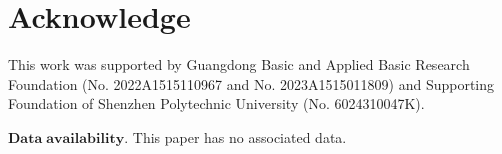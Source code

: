 \documentclass[11pt,twoside]{article}
\theoremstyle{definition}
\theoremstyle{remark}
\begin{document}






\section{Acknowledge}
This work was supported by Guangdong Basic and Applied Basic Research Foundation (No. 2022A1515110967 and No. 2023A1515011809) and Supporting Foundation of Shenzhen Polytechnic University (No. 6024310047K).


\begin{flushleft}
 $\mathbf{Data\;availability}.$  This paper has no associated data.
\end{flushleft}
\end{document}
